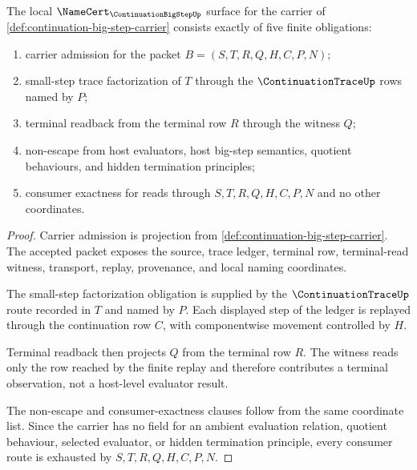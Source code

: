 \begin{theorem}
\label{thm:continuation-big-step-namecert-obligations}
The local $\NameCert_{\ContinuationBigStepUp}$ surface for the carrier of \autoref{def:continuation-big-step-carrier} consists exactly of five finite obligations:
\begin{enumerate}
\item carrier admission for the packet $B=(S,T,R,Q,H,C,P,N)$;
\item small-step trace factorization of $T$ through the $\ContinuationTraceUp$ rows named by $P$;
\item terminal readback from the terminal row $R$ through the witness $Q$;
\item non-escape from host evaluators, host big-step semantics, quotient behaviours, and hidden termination principles;
\item consumer exactness for reads through $S,T,R,Q,H,C,P,N$ and no other coordinates.
\end{enumerate}
\end{theorem}
\begin{proof}
Carrier admission is projection from \autoref{def:continuation-big-step-carrier}. The accepted packet exposes the source, trace ledger, terminal row, terminal-read witness, transport, replay, provenance, and local naming coordinates.

The small-step factorization obligation is supplied by the $\ContinuationTraceUp$ route recorded in $T$ and named by $P$. Each displayed step of the ledger is replayed through the continuation row $C$, with componentwise movement controlled by $H$.

Terminal readback then projects $Q$ from the terminal row $R$. The witness reads only the row reached by the finite replay and therefore contributes a terminal observation, not a host-level evaluator result.

The non-escape and consumer-exactness clauses follow from the same coordinate list. Since the carrier has no field for an ambient evaluation relation, quotient behaviour, selected evaluator, or hidden termination principle, every consumer route is exhausted by $S,T,R,Q,H,C,P,N$.
\end{proof}

